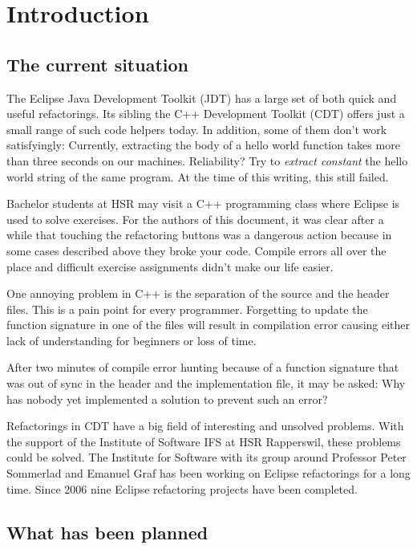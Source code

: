 \chapter{Introduction}
\thispagestyle{fancy}

\section{The current situation}

The Eclipse Java Development Toolkit (JDT) has a large set of both quick and
useful refactorings. Its sibling the C++ Development Toolkit (CDT) offers just a
small range of such code helpers today. In addition, some of them don't work
satisfyingly: Currently, extracting the body of a hello world function takes more
than three seconds on our machines. Reliability? Try to \textit{extract
constant} the hello world string of the same program. At the time of this 
writing, this still failed.

Bachelor students at HSR may visit a C++ programming class where
Eclipse is used to solve exercises. For the authors of this document, it was 
clear after a while that
touching the refactoring buttons was a dangerous action because in some cases
described above they broke your code. Compile errors all over the place and
difficult exercise assignments didn't make our life easier.

One annoying problem in C++ is the separation of the source and the header
files. This is a pain point for every programmer. Forgetting to update the
function signature in one of the files will result in compilation error causing
either lack of understanding for beginners or loss of time.

After two minutes of compile error hunting because of a function signature that 
was out of sync in the header and the implementation file, it may be asked: Why
has nobody yet implemented a solution to prevent such an error?

Refactorings in CDT have a big field of interesting and unsolved problems. With 
the support of the Institute of Software IFS at HSR Rapperswil, these problems 
could be solved. The Institute for Software with its group around Professor 
Peter Sommerlad and Emanuel Graf has been working on Eclipse refactorings for a 
long time. Since 2006 nine Eclipse refactoring projects have been completed.

\section{What has been planned}

